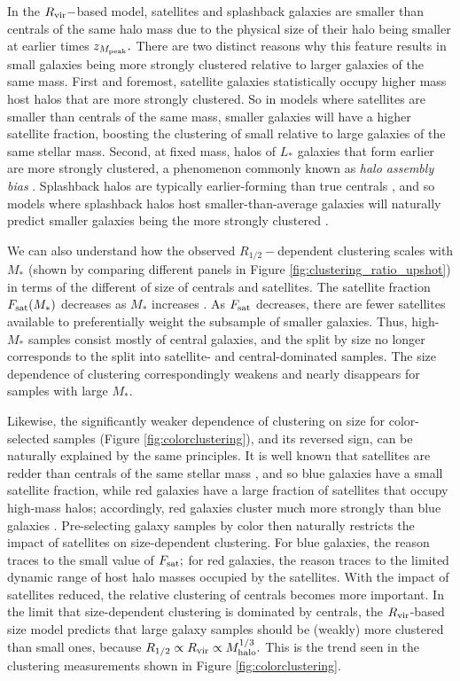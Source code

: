 \documentclass[usenatbib,usegraphicx,letterpaper]{mn2e}
\newcommand{\rhalf}{R_{1/2}}
\newcommand{\mstar}{M_{\ast}}
\newcommand{\zpeak}{z_{M_{\rm peak}}}
\newcommand{\mhalo}{M_{\rm halo}}
\newcommand{\rvir}{R_{\rm vir}}
\begin{document}
In the $\rvir-$based model, satellites and splashback galaxies are smaller than centrals of the same halo mass due to the physical size of their halo being smaller at earlier times $\zpeak.$ There are two distinct reasons why this feature results in small galaxies being more strongly clustered relative to larger galaxies of the same mass. First and foremost, satellite galaxies statistically occupy higher mass host halos that are more strongly clustered. So in models where satellites are smaller than centrals of the same mass, smaller galaxies will have a higher satellite fraction, boosting the clustering of small relative to large galaxies of the same stellar mass. Second, at fixed mass, halos of $L_\ast$ galaxies that form earlier are more strongly clustered, a phenomenon commonly known as {\em halo assembly bias} \citep{gao_white05,wechsler_etal06}. Splashback halos are typically earlier-forming than true centrals \citep{wang_etal09}, and so models where splashback halos host smaller-than-average galaxies will naturally predict smaller galaxies being the more strongly clustered \citep[see][for an example of the splashback-dependence of halo clustering]{sunayama_etal16}.

We can also understand how the observed $\rhalf-$dependent clustering scales with $\mstar$ (shown by comparing different panels in Figure \ref{fig:clustering_ratio_upshot}) in terms of the different of size of centrals and satellites. The satellite fraction $F_{\rm sat}(\mstar)$ decreases as $\mstar$ increases \citep[e.g.,][]{guo_etal11,reddick_etal13}. As $F_{\rm sat}$ decreases, there are fewer satellites available to preferentially weight the subsample of smaller galaxies. Thus,  high-$\mstar$ samples consist mostly of central galaxies, and the split by size no longer corresponds to the split into satellite- and central-dominated samples. The size dependence of clustering correspondingly weakens and nearly disappears for samples with large $\mstar$.

Likewise, the significantly weaker dependence of clustering on size for color-selected samples (Figure \ref{fig:colorclustering}), and its reversed sign, can be naturally explained by the same principles.  It is well known that satellites are redder than centrals of the same stellar mass \citep[e.g.,][]{vdB_etal08}, and so blue galaxies have a small satellite fraction, while red galaxies have a large fraction of satellites that occupy high-mass halos; accordingly, red galaxies cluster much more strongly than blue galaxies \citep[e.g.,][]{zehavi_etal11}. Pre-selecting galaxy samples by color then naturally restricts the impact of satellites on size-dependent clustering. For blue galaxies, the reason traces to the small value of $F_{\rm sat};$ for red galaxies, the reason traces to the limited dynamic range of host halo masses occupied by the satellites. With the impact of satellites reduced, the relative clustering of centrals becomes more important. In the limit that size-dependent clustering is dominated by centrals, the $\rvir$-based size model predicts that large galaxy samples should be (weakly) more clustered than small ones, because $\rhalf\propto\rvir\propto\mhalo^{1/3}.$ This is the trend seen in the clustering measurements shown in Figure \ref{fig:colorclustering}.
\end{document}
